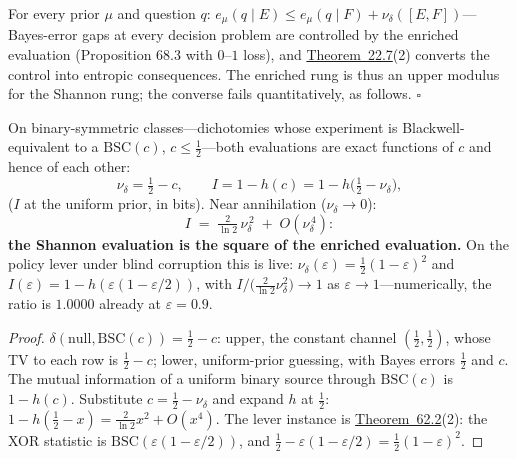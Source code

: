 
\begin{thmplain}

For every prior \(\mu\) and question \(q\): \(e_\mu(q \mid E) \le e_\mu(q \mid F) + \nu_\delta([E, F])\)---\hspace{0pt}Bayes-error gaps at every decision problem are controlled by the enriched evaluation (Proposition 68.3 with \(0\)--\(1\) loss), and \hyperlink{stmt:22.7}{Theorem~22.7}(2) converts the control into entropic consequences. The enriched rung is thus an upper modulus for the Shannon rung; the converse fails quantitatively, as follows. \(\square\)
\end{thmplain}

\begin{thmplain}

On binary-symmetric classes---\hspace{0pt}dichotomies whose experiment is Blackwell-equivalent to a \(\mathrm{BSC}(c)\), \(c \le \tfrac12\)---\hspace{0pt}both evaluations are exact functions of \(c\) and hence of each other:
\[
\nu_\delta = \tfrac12 - c,
\qquad
I = 1 - h(c) = 1 - h\big(\tfrac12 - \nu_\delta\big),
\]
(\(I\) at the uniform prior, in bits). Near annihilation (\(\nu_\delta \to 0\)):
\[
I \;=\; \tfrac{2}{\ln 2}\,\nu_\delta^{\,2} \;+\; O(\nu_\delta^{\,4}):
\]
\textbf{the Shannon evaluation is the square of the enriched evaluation.} On the policy lever under blind corruption this is live: \(\nu_\delta(\varepsilon) = \tfrac12(1-\varepsilon)^2\) and \(I(\varepsilon) = 1 - h(\varepsilon(1 - \varepsilon/2))\), with \(I / \big(\tfrac{2}{\ln 2}\nu_\delta^2\big) \to 1\) as \(\varepsilon \to 1\)---\hspace{0pt}numerically, the ratio is \(1.0000\) already at \(\varepsilon = 0.9\).
\end{thmplain}

\begin{proof}

\(\delta(\text{null}, \mathrm{BSC}(c)) = \tfrac12 - c\): upper, the constant channel \((\tfrac12, \tfrac12)\), whose TV to each row is \(\tfrac12 - c\); lower, uniform-prior guessing, with Bayes errors \(\tfrac12\) and \(c\). The mutual information of a uniform binary source through \(\mathrm{BSC}(c)\) is \(1 - h(c)\). Substitute \(c = \tfrac12 - \nu_\delta\) and expand \(h\) at \(\tfrac12\): \(1 - h(\tfrac12 - x) = \tfrac{2}{\ln 2}x^2 + O(x^4)\). The lever instance is \hyperlink{stmt:62.2}{Theorem~62.2}(2): the XOR statistic is \(\mathrm{BSC}(\varepsilon(1-\varepsilon/2))\), and \(\tfrac12 - \varepsilon(1 - \varepsilon/2) = \tfrac12(1-\varepsilon)^2\).
\end{proof}

